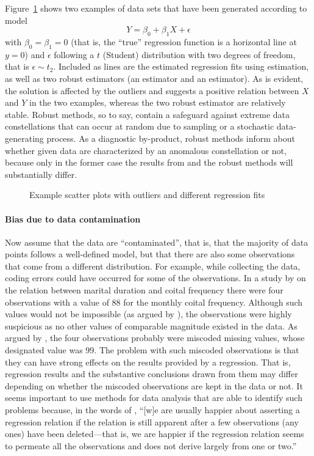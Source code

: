 Figure~\ref{fig:outliers-and-fits} shows two examples of data sets that have
been generated according to model
\[
    Y = \beta_0 + \beta_1 X + \epsilon
\]
with $\beta_0 = \beta_1 = 0$ (that is, the “true” regression function is a
horizontal line at $y=0$) and $\epsilon$ following a $t$ (Student) distribution with two
degrees of freedom, that is $\epsilon \sim t_2$. Included as lines are the
estimated regression fits using  estimation, as well as two robust
estimators (an  estimator and an  estimator). As is evident,
the  solution is affected by the outliers and suggests a positive
relation between $X$ and $Y$ in the two examples, whereas the two robust
estimator are relatively stable. Robust methods, so to say, contain a safeguard
against extreme data constellations that can occur at random due to sampling or
a stochastic data-generating process. As a diagnostic by-product, robust
methods inform about whether given data are characterized by an anomalous
constellation or not, because only in the former case the results from
 and the robust methods will substantially differ.


\begin{figure}[h!]
    \centering
    \caption{Example scatter plots with outliers and different regression fits}
    \label{fig:outliers-and-fits}
\end{figure}

\paragraph{Bias due to data contamination}

Now assume that the data are “contaminated”, that is, that the majority of data
points follows a well-defined model, but that there are also some observations
that come from a different distribution. For example, while collecting the
data, coding errors could have occurred for some of the observations. In a
study by \citet{jasso85} on the relation between marital duration and coital
frequency there were four observations with a value of 88 for the monthly
coital frequency. Although such values would not be impossible (as argued by
\citealp{jasso85}), the observations were highly suspicious as no other values
of comparable magnitude existed in the data. As argued by \citet{kahnudry86},
the four observations probably were miscoded missing values, whose designated
value was 99. The problem with such miscoded observations is that they can have
strong effects on the results provided by a  regression. That is,
regression results and the substantive conclusions drawn from them may differ
depending on whether the miscoded observations are kept in the data or not. It
seems important to use methods for data analysis that are able to identify such
problems because, in the words of \citet[18]{anscombe73}, “[w]e are usually
happier about asserting a regression relation if the relation is still apparent
after a few observations (any ones) have been deleted---that is, we are happier
if the regression relation seems to permeate all the observations and does not
derive largely from one or two.”

